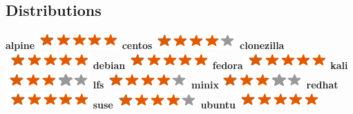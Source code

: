 \documentclass[]{friggeri-cv}
\begin{document}
\begin{aside}
    \section{Distributions}
        \textbf{alpine}\includegraphics[scale=0.40]{img/5stars.png}
        \textbf{centos}\includegraphics[scale=0.40]{img/4stars.png}
        \textbf{clonezilla}\includegraphics[scale=0.40]{img/5stars.png}
        \textbf{debian}\includegraphics[scale=0.40]{img/5stars.png}
        \textbf{fedora}\includegraphics[scale=0.40]{img/5stars.png}
        \textbf{kali}\includegraphics[scale=0.40]{img/3stars.png}
        \textbf{lfs}\includegraphics[scale=0.40]{img/4stars.png}
        \textbf{minix}\includegraphics[scale=0.40]{img/3stars.png}
        \textbf{redhat}\includegraphics[scale=0.40]{img/5stars.png}
        \textbf{suse}\includegraphics[scale=0.40]{img/4stars.png}
        \textbf{ubuntu}\includegraphics[scale=0.40]{img/5stars.png}
        ~

\end{aside}
\end{document}
